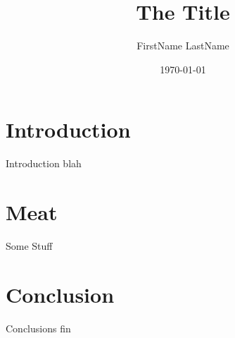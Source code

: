 \documentclass{beamer}
\title{The Title}
\author[LastName]{FirstName LastName}
\institute{University of Arizona}
\date{\today}
\begin{document}
\begin{frame}
  \titlepage
\end{frame}

\begin{frame}
  \tableofcontents
\end{frame}

\section{Introduction}
\label{sec:intro}

\begin{frame}{Introduction}
blah
\end{frame}

\section{Meat}
\label{sec:meat}

\begin{frame}{Some Stuff}
\centering {}
\end{frame}

\section{Conclusion}
\label{sec:conclusion}

\begin{frame}{Conclusions}
fin
\end{frame}
\end{document}
